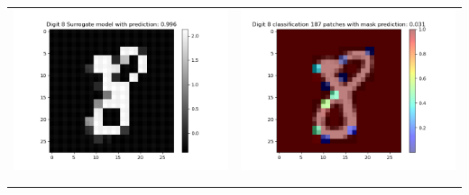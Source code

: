 \documentclass[12pt]{article}
\begin{document}
\begin{table}[H]
\begin{tabular}{|c|c|}
\begin{minipage}{0.45\linewidth}
            \includegraphics[width=\linewidth]{../fig/ID 4-Digit 8 pred 8 new_image.png}
        \end{minipage} &
        \begin{minipage}{0.45\linewidth}
            \centering

            \includegraphics[width=\linewidth]{../fig/ID 4-Digit 8 classification n patches = 187.png}
        \end{minipage} \\
        \\
        \hline
        \begin{minipage}{0.45\linewidth}
            \centering


\end{minipage}
\end{tabular}
\end{table}
\end{document}
